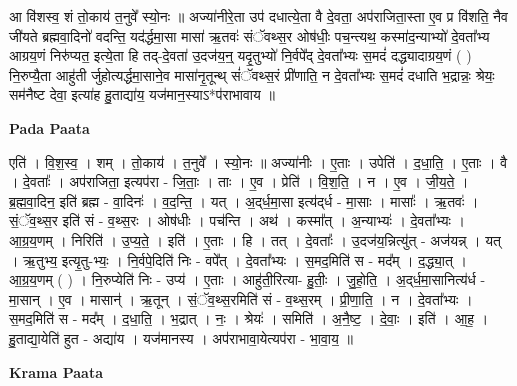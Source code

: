\documentclass[17pt]{extarticle}
\begin{document}
आ वि॑शस्व॒ शं तो॒काय॑ त॒नुवे᳚ स्यो॒नः ॥ अज्या॑नीरे॒ता उप॑ दधात्ये॒ता वै दे॒वता॒ अप॑राजिता॒स्ता ए॒व प्र वि॑शति॒ नैव जी॑यते ब्रह्मवा॒दिनो॑ वदन्ति॒ यद॑र्द्धमा॒सा मासा॑ ऋ॒तवः॑ संॅवथ्स॒र ओष॑धीः॒ पच॒न्त्यथ॒ कस्मा॑द॒न्याभ्यो॑ दे॒वता᳚भ्य आग्रय॒णं निरु॑प्यत॒ इत्ये॒ता हि तद्-दे॒वता॑ उ॒दज॑य॒न्॒ यदृ॒तुभ्यो॑ नि॒र्वपे᳚द् दे॒वता᳚भ्यः स॒मदं॑ दद्ध्यादाग्रय॒णं ( ) नि॒रुप्यै॒ता आहु॑ती र्जुहोत्यर्द्धमा॒साने॒व मासा॑नृ॒तून्थ् सं॑ॅवथ्स॒रं प्री॑णाति॒ न दे॒वता᳚भ्यः स॒मदं॑ दधाति भ॒द्रान्नः॒ श्रेयः॒ सम॑नैष्ट देवा॒ इत्या॑ह हु॒ताद्या॑य॒ यज॑मान॒स्याऽ*प॑राभावाय ॥ \newline

\textbf{Pada Paata} \newline

एति॑ । वि॒श॒स्व॒ । शम् । तो॒काय॑ । त॒नुवे᳚ । स्यो॒नः ॥ अज्या॑नीः । ए॒ताः । उपेति॑ । द॒धा॒ति॒ । ए॒ताः । वै । दे॒वताः᳚ । अप॑राजिता॒ इत्यप॑रा - जि॒ताः॒ । ताः । ए॒व । प्रेति॑ । वि॒श॒ति॒ । न । ए॒व । जी॒य॒ते॒ । ब्र॒ह्म॒वा॒दिन॒ इति॑ ब्रह्म - वा॒दिनः॑ । व॒द॒न्ति॒ । यत् । अ॒द्‌र्ध॒मा॒सा इत्य॑द्‌र्ध - मा॒साः । मासाः᳚ । ऋ॒तवः॑ । सं॒ॅव॒थ्स॒र इति॑ सं - व॒थ्स॒रः । ओष॑धीः । पच॑न्ति । अथ॑ । कस्मा᳚त् । अ॒न्याभ्यः॑ । दे॒वता᳚भ्यः । आ॒ग्र॒य॒णम् । निरिति॑ । उ॒प्य॒ते॒ । इति॑ । ए॒ताः । हि । तत् । दे॒वताः᳚ । उ॒दज॑य॒न्नित्यु॑त् - अज॑यन्न् । यत् । ऋ॒तुभ्य॒ इत्यृ॒तु-भ्यः॒ । नि॒र्वपे॒दिति॑ निः - वपे᳚त् । दे॒वता᳚भ्यः । स॒मद॒मिति॑ स - मद᳚म् । द॒द्ध्या॒त् । आ॒ग्र॒य॒णम् ( ) । नि॒रुप्येति॑ निः - उप्य॑ । ए॒ताः । आहु॑ती॒रित्या- हु॒तीः॒ । जु॒हो॒ति॒ । अ॒द्‌र्ध॒मा॒सानित्य॑र्ध - मा॒सान् । ए॒व । मासान्॑ । ऋ॒तून् । सं॒ॅव॒थ्स॒रमिति॑ सं - व॒थ्स॒रम् । प्री॒णा॒ति॒ । न । दे॒वता᳚भ्यः । स॒मद॒मिति॑ स - मद᳚म् । द॒धा॒ति॒ । भ॒द्रात् । नः॒ । श्रेयः॑ । समिति॑ । अ॒नै॒ष्ट॒ । दे॒वाः॒ । इति॑ । आ॒ह॒ । हु॒ताद्या॒येति॑ हुत - अद्या॑य । यज॑मानस्य । अप॑राभावा॒येत्यप॑रा - भा॒वा॒य॒ ॥  \newline


\textbf{Krama Paata} \newline
\end{document}
